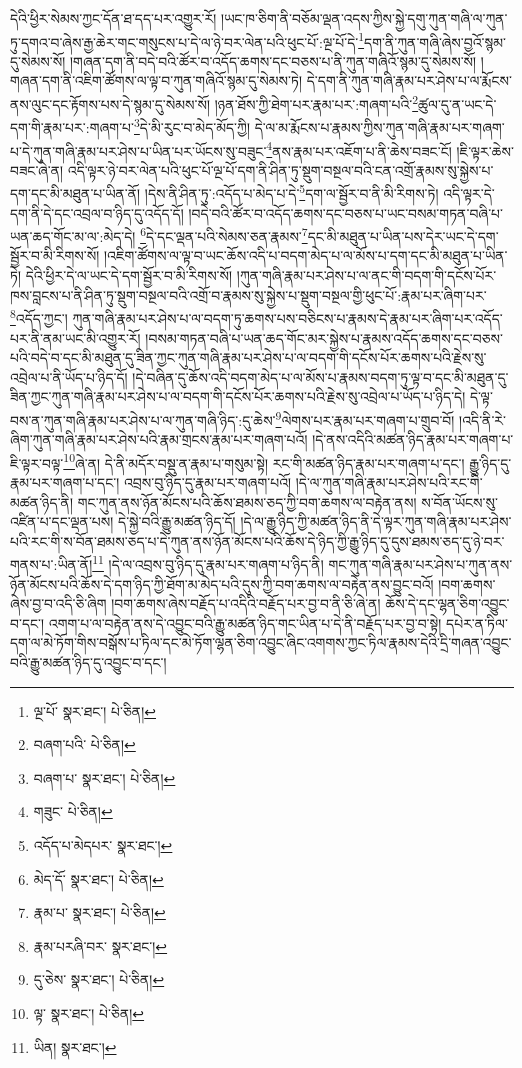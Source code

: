 དེའི་ཕྱིར་སེམས་ཀྱང་དོན་ཐ་དད་པར་འགྱུར་རོ། །ཡང་ཁ་ཅིག་ནི་བཅོམ་ལྡན་འདས་ཀྱིས་སྐྱེ་དགུ་ཀུན་གཞི་ལ་ཀུན་ཏུ་དགའ་བ་ཞེས་རྒྱ་ཆེར་གང་གསུངས་པ་དེ་ལ་ཉེ་བར་ལེན་པའི་ཕུང་པོ་:ལྔ་པོ་དེ་\footnote{ལྔ་པོ་  སྣར་ཐང་།  པེ་ཅིན། }དག་ནི་ཀུན་གཞི་ཞེས་བྱའོ་སྙམ་དུ་སེམས་སོ། །གཞན་དག་ནི་བདེ་བའི་ཚོར་བ་འདོད་ཆགས་དང་བཅས་པ་ནི་ཀུན་གཞིའོ་སྙམ་དུ་སེམས་སོ། །གཞན་དག་ནི་འཇིག་ཚོགས་ལ་ལྟ་བ་ཀུན་གཞིའོ་སྙམ་དུ་སེམས་ཏེ། དེ་དག་ནི་ཀུན་གཞི་རྣམ་པར་ཤེས་པ་ལ་རྨོངས་ནས་ལུང་དང་རྟོགས་པས་དེ་སྙམ་དུ་སེམས་སོ། །ཉན་ཐོས་ཀྱི་ཐེག་པར་རྣམ་པར་:གཞག་པའི་\footnote{བཞག་པའི་  པེ་ཅིན། }ཚུལ་དུ་ན་ཡང་དེ་དག་གི་རྣམ་པར་:གཞག་པ་\footnote{བཞག་པ་  སྣར་ཐང་།  པེ་ཅིན། }དེ་མི་རུང་བ་མེད་མོད་ཀྱི། དེ་ལ་མ་རྨོངས་པ་རྣམས་ཀྱིས་ཀུན་གཞི་རྣམ་པར་གཞག་པ་དེ་ཀུན་གཞི་རྣམ་པར་ཤེས་པ་ཡིན་པར་ཡོངས་སུ་བཟུང་\footnote{གཟུང་  པེ་ཅིན། }ནས་རྣམ་པར་འཇོག་པ་ནི་ཆེས་བཟང་ངོ། །ཇི་ལྟར་ཆེས་བཟང་ཞེ་ན། འདི་ལྟར་ཉེ་བར་ལེན་པའི་ཕུང་པོ་ལྔ་པོ་དག་ནི་ཤིན་ཏུ་སྡུག་བསྔལ་བའི་ངན་འགྲོ་རྣམས་སུ་སྐྱེས་པ་དག་དང་མི་མཐུན་པ་ཡིན་ནོ། །དེས་ནི་ཤིན་ཏུ་:འདོད་པ་མེད་པ་དེ་\footnote{འདོད་པ་མེདཔར་  སྣར་ཐང་། }དག་ལ་སྦྱོར་བ་ནི་མི་རིགས་ཏེ། འདི་ལྟར་དེ་དག་ནི་དེ་དང་འབྲལ་བ་ཉིད་དུ་འདོད་དོ། །བདེ་བའི་ཚོར་བ་འདོད་ཆགས་དང་བཅས་པ་ཡང་བསམ་གཏན་བཞི་པ་ཡན་ཆད་གོང་མ་ལ་:མེད་དེ། \footnote{མེད་དོ་  སྣར་ཐང་།  པེ་ཅིན། }དེ་དང་ལྡན་པའི་སེམས་ཅན་རྣམས་\footnote{རྣམ་པ་  སྣར་ཐང་།  པེ་ཅིན། }དང་མི་མཐུན་པ་ཡིན་པས་དེར་ཡང་དེ་དག་སྦྱོར་བ་མི་རིགས་སོ། །འཇིག་ཚོགས་ལ་ལྟ་བ་ཡང་ཆོས་འདི་པ་བདག་མེད་པ་ལ་མོས་པ་དག་དང་མི་མཐུན་པ་ཡིན་ཏེ། དེའི་ཕྱིར་དེ་ལ་ཡང་དེ་དག་སྦྱོར་བ་མི་རིགས་སོ། །ཀུན་གཞི་རྣམ་པར་ཤེས་པ་ལ་ནང་གི་བདག་གི་དངོས་པོར་ཁས་བླངས་པ་ནི་ཤིན་ཏུ་སྡུག་བསྔལ་བའི་འགྲོ་བ་རྣམས་སུ་སྐྱེས་པ་སྡུག་བསྔལ་གྱི་ཕུང་པོ་:རྣམ་པར་ཞིག་པར་\footnote{རྣམ་པརཞི་བར་  སྣར་ཐང་། }འདོད་ཀྱང་། ཀུན་གཞི་རྣམ་པར་ཤེས་པ་ལ་བདག་ཏུ་ཆགས་པས་བཅིངས་པ་རྣམས་དེ་རྣམ་པར་ཞིག་པར་འདོད་པར་ནི་ནམ་ཡང་མི་འགྱུར་རོ། །བསམ་གཏན་བཞི་པ་ཡན་ཆད་གོང་མར་སྐྱེས་པ་རྣམས་འདོད་ཆགས་དང་བཅས་པའི་བདེ་བ་དང་མི་མཐུན་དུ་ཟིན་ཀྱང་ཀུན་གཞི་རྣམ་པར་ཤེས་པ་ལ་བདག་གི་དངོས་པོར་ཆགས་པའི་རྗེས་སུ་འབྲེལ་པ་ནི་ཡོད་པ་ཉིད་དོ། །དེ་བཞིན་དུ་ཆོས་འདི་བདག་མེད་པ་ལ་མོས་པ་རྣམས་བདག་ཏུ་ལྟ་བ་དང་མི་མཐུན་དུ་ཟིན་ཀྱང་ཀུན་གཞི་རྣམ་པར་ཤེས་པ་ལ་བདག་གི་དངོས་པོར་ཆགས་པའི་རྗེས་སུ་འབྲེལ་པ་ཡོད་པ་ཉིད་དེ། དེ་ལྟ་བས་ན་ཀུན་གཞི་རྣམ་པར་ཤེས་པ་ལ་ཀུན་གཞི་ཉིད་:དུ་ཆེས་\footnote{དུ་ཅེས་  སྣར་ཐང་།  པེ་ཅིན། }ལེགས་པར་རྣམ་པར་གཞག་པ་གྲུབ་བོ། །འདི་ནི་རེ་ཞིག་ཀུན་གཞི་རྣམ་པར་ཤེས་པའི་རྣམ་གྲངས་རྣམ་པར་གཞག་པའོ། །དེ་ནས་འདིའི་མཚན་ཉིད་རྣམ་པར་གཞག་པ་ཇི་ལྟར་བལྟ་\footnote{ལྟ་  སྣར་ཐང་།  པེ་ཅིན། }ཞེ་ན། དེ་ནི་མདོར་བསྡུ་ན་རྣམ་པ་གསུམ་སྟེ། རང་གི་མཚན་ཉིད་རྣམ་པར་གཞག་པ་དང་། རྒྱུ་ཉིད་དུ་རྣམ་པར་གཞག་པ་དང་། འབྲས་བུ་ཉིད་དུ་རྣམ་པར་གཞག་པའོ། །དེ་ལ་ཀུན་གཞི་རྣམ་པར་ཤེས་པའི་རང་གི་མཚན་ཉིད་ནི། གང་ཀུན་ནས་ཉོན་མོངས་པའི་ཆོས་ཐམས་ཅད་ཀྱི་བག་ཆགས་ལ་བརྟེན་ནས། ས་བོན་ཡོངས་སུ་འཛིན་པ་དང་ལྡན་པས། དེ་སྐྱེ་བའི་རྒྱུ་མཚན་ཉིད་དོ། །དེ་ལ་རྒྱུ་ཉིད་ཀྱི་མཚན་ཉིད་ནི་དེ་ལྟར་ཀུན་གཞི་རྣམ་པར་ཤེས་པའི་རང་གི་ས་བོན་ཐམས་ཅད་པ་དེ་ཀུན་ནས་ཉོན་མོངས་པའི་ཆོས་དེ་ཉིད་ཀྱི་རྒྱུ་ཉིད་དུ་དུས་ཐམས་ཅད་དུ་ཉེ་བར་གནས་པ་:ཡིན་ནོ།\footnote{ཡིན།  སྣར་ཐང་། } །དེ་ལ་འབྲས་བུ་ཉིད་དུ་རྣམ་པར་གཞག་པ་ཉིད་ནི། གང་ཀུན་གཞི་རྣམ་པར་ཤེས་པ་ཀུན་ནས་ཉོན་མོངས་པའི་ཆོས་དེ་དག་ཉིད་ཀྱི་ཐོག་མ་མེད་པའི་དུས་ཀྱི་བག་ཆགས་ལ་བརྟེན་ནས་བྱུང་བའོ། །བག་ཆགས་ཞེས་བྱ་བ་འདི་ཅི་ཞིག །བག་ཆགས་ཞེས་བརྗོད་པ་འདིའི་བརྗོད་པར་བྱ་བ་ནི་ཅི་ཞེ་ན། ཆོས་དེ་དང་ལྷན་ཅིག་འབྱུང་བ་དང་། འགག་པ་ལ་བརྟེན་ནས་དེ་འབྱུང་བའི་རྒྱུ་མཚན་ཉིད་གང་ཡིན་པ་དེ་ནི་བརྗོད་པར་བྱ་བ་སྟེ། དཔེར་ན་ཏིལ་དག་ལ་མེ་ཏོག་གིས་བསྒོས་པ་ཏིལ་དང་མེ་ཏོག་ལྷན་ཅིག་འབྱུང་ཞིང་འགགས་ཀྱང་ཏིལ་རྣམས་དེའི་དྲི་གཞན་འབྱུང་བའི་རྒྱུ་མཚན་ཉིད་དུ་འབྱུང་བ་དང་། 